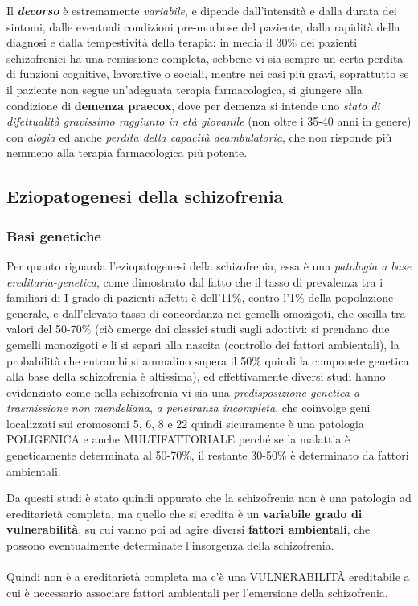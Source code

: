 Il \textbf{\emph{decorso}} è estremamente \emph{variabile}, e dipende
dall'intensità e dalla durata dei sintomi, dalle eventuali condizioni
pre-morbose del paziente, dalla rapidità della diagnosi e dalla
tempestività della terapia: in media il 30\% dei pazienti schizofrenici
ha una remissione completa, sebbene vi sia sempre un certa perdita di
funzioni cognitive, lavorative o sociali, mentre nei casi più gravi,
soprattutto se il paziente non segue un'adeguata terapia farmacologica,
si giungere alla condizione di \textbf{demenza praecox}, dove per
demenza si intende uno \emph{stato di difettualità gravissimo raggiunto
in età giovanile} (non oltre i 35-40 anni in genere) con \emph{alogia}
ed anche \emph{perdita della capacità deambulatoria}, che non risponde
più nemmeno alla terapia farmacologica più potente.

\subsection{Eziopatogenesi della schizofrenia}

\subsubsection{Basi genetiche}
Per quanto riguarda l'eziopatogenesi della schizofrenia, essa è una
\emph{patologia a base ereditaria-genetica}, come dimostrato dal fatto
che il tasso di prevalenza tra i familiari di I grado di pazienti
affetti è dell'11\%, contro l'1\% della popolazione generale, e
dall'elevato tasso di concordanza nei gemelli omozigoti, che oscilla tra
valori del 50-70\% (ciò emerge dai classici studi sugli adottivi: si
prendano due gemelli monozigoti e li si separi alla nascita (controllo
dei fattori ambientali), la probabilità che entrambi si ammalino supera
il 50\% quindi la componete genetica alla base della schizofrenia è
altissima), ed effettivamente diversi studi hanno evidenziato come nella
schizofrenia vi sia una \emph{predisposizione genetica a trasmissione
non mendeliana}, \emph{a penetranza incompleta}, che coinvolge geni
localizzati sui cromosomi 5, 6, 8 e 22 quindi sicuramente è una
patologia POLIGENICA e anche MULTIFATTORIALE perché se la malattia è
geneticamente determinata al 50-70\%, il restante 30-50\% è determinato
da fattori ambientali.

Da questi studi è stato quindi appurato che la schizofrenia non è una
patologia ad ereditarietà completa, ma quello che si eredita è un
\textbf{variabile grado di vulnerabilità}, su cui vanno poi ad agire
diversi \textbf{fattori ambientali}, che possono eventualmente
determinate l'insorgenza della schizofrenia.
\\\\
Quindi non è a ereditarietà completa ma c'è una VULNERABILITÀ
ereditabile a cui è necessario associare fattori ambientali per
l'emersione della schizofrenia.

